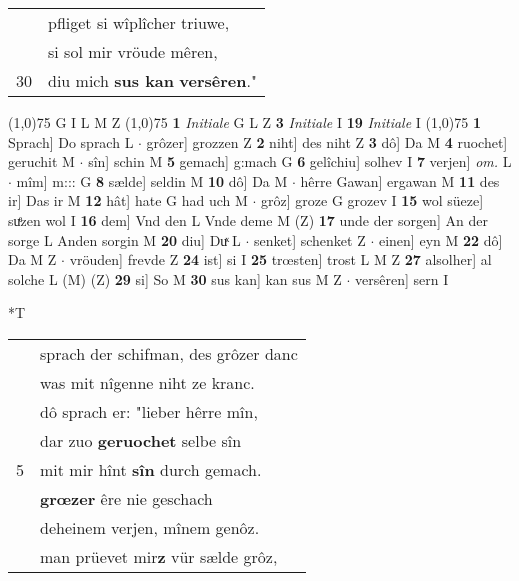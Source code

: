 \documentclass[8pt,a4paper,notitlepage]{article}
\begin{document}
\begin{table}[ht]
\begin{minipage}[t]{0.5\linewidth}
\begin{tabular}{rl}
 & pfliget si wîplîcher triuwe,\\ 
 & si sol mir vröude mêren,\\ 
30 & diu mich \textbf{sus kan} \textbf{versêren}."\\ 
\end{tabular}
\scriptsize
\line(1,0){75} \newline
G I L M Z \newline
\line(1,0){75} \newline
\textbf{1} \textit{Initiale} G L Z  \textbf{3} \textit{Initiale} I  \textbf{19} \textit{Initiale} I  \newline
\line(1,0){75} \newline
\textbf{1} Sprach] Do sprach L  $\cdot$ grôzer] grozzen Z \textbf{2} niht] des niht Z \textbf{3} dô] Da M \textbf{4} ruochet] geruchit M  $\cdot$ sîn] schin M \textbf{5} gemach] g:mach G \textbf{6} gelîchiu] solhev I \textbf{7} verjen] \textit{om.} L  $\cdot$ mîm] m::: G \textbf{8} sælde] seldin M \textbf{10} dô] Da M  $\cdot$ hêrre Gawan] ergawan M \textbf{11} des ir] Das ir M \textbf{12} hât] hate G had uch M  $\cdot$ grôz] groze G grozev I \textbf{15} wol süeze] suͤzen wol I \textbf{16} dem] Vnd den L Vnde deme M (Z) \textbf{17} unde der sorgen] An der sorge L Anden sorgin M \textbf{20} diu] Duͯ L  $\cdot$ senket] schenket Z  $\cdot$ einen] eyn M \textbf{22} dô] Da M Z  $\cdot$ vröuden] frevde Z \textbf{24} ist] si I \textbf{25} trœsten] trost L M Z \textbf{27} alsolher] al solche L (M) (Z) \textbf{29} si] So M \textbf{30} sus kan] kan sus M Z  $\cdot$ versêren] sern I \newline
\end{minipage}
\hspace{0.5cm}
\begin{minipage}[t]{0.5\linewidth}
\small
\begin{center}*T
\end{center}
\begin{tabular}{rl}
 & sprach der schifman, des grôzer danc\\ 
 & was mit nîgenne niht ze kranc.\\ 
 & dô sprach er: "lieber hêrre mîn,\\ 
 & dar zuo \textbf{geruochet} selbe sîn\\ 
5 & mit mir hînt \textbf{sîn} durch gemach.\\ 
 & \textbf{grœzer} êre nie geschach\\ 
 & deheinem verjen, mînem genôz.\\ 
 & man prüevet mir\textbf{z} vür sælde grôz,\\ 

\end{tabular}
\end{minipage}
\end{table}
\end{document}
